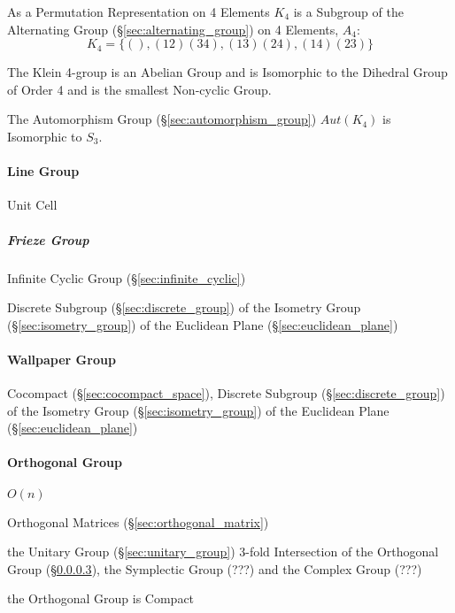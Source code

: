 As a Permutation Representation on 4 Elements $K_4$ is a Subgroup of
the Alternating Group (\S\ref{sec:alternating_group}) on 4 Elements,
$A_4$:
\[
    K_4 = \{ (), (12)(34), (13)(24), (14)(23) \}
\]

The Klein 4-group is an Abelian Group and is Isomorphic to the
Dihedral Group of Order 4 and is the smallest Non-cyclic Group.

The Automorphism Group (\S\ref{sec:automorphism_group}) $Aut(K_4)$ is
Isomorphic to $S_3$.



\paragraph{Line Group}\label{sec:line_group}\hfill

Unit Cell



\subparagraph{Frieze Group}\label{sec:frieze_group}\hfill

Infinite Cyclic Group (\S\ref{sec:infinite_cyclic})

Discrete Subgroup (\S\ref{sec:discrete_group}) of the Isometry Group
(\S\ref{sec:isometry_group}) of the Euclidean Plane
(\S\ref{sec:euclidean_plane})



\paragraph{Wallpaper Group}\label{sec:wallpaper_group}\hfill

Cocompact (\S\ref{sec:cocompact_space}), Discrete Subgroup
(\S\ref{sec:discrete_group}) of the Isometry Group (\S\ref{sec:isometry_group})
of the Euclidean Plane (\S\ref{sec:euclidean_plane})



\paragraph{Orthogonal Group}\label{sec:orthogonal_group}\hfill

$O(n)$

Orthogonal Matrices (\S\ref{sec:orthogonal_matrix})

the Unitary Group (\S\ref{sec:unitary_group}) 3-fold Intersection of the
Orthogonal Group (\S\ref{sec:orthogonal_group}), the Symplectic Group (???) and
the Complex Group (???) %

the Orthogonal Group is Compact

